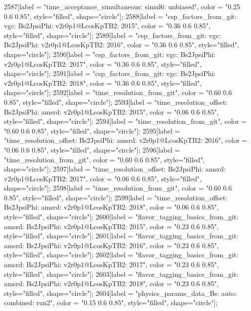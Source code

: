{	2587[label = "time_acceptance_simultaneous\ntimeacc: simul6\ntrigger: unbiased", color = "0.25 0.6 0.85", style="filled", shape="circle"];
	2588[label = "csp_factors_from_git\ncsp: vgc\nmode: Bs2JpsiPhi\nversion: v2r0p1@LcosKpTB2\nyear: 2015", color = "0.36 0.6 0.85", style="filled", shape="circle"];
	2589[label = "csp_factors_from_git\ncsp: vgc\nmode: Bs2JpsiPhi\nversion: v2r0p1@LcosKpTB2\nyear: 2016", color = "0.36 0.6 0.85", style="filled", shape="circle"];
	2590[label = "csp_factors_from_git\ncsp: vgc\nmode: Bs2JpsiPhi\nversion: v2r0p1@LcosKpTB2\nyear: 2017", color = "0.36 0.6 0.85", style="filled", shape="circle"];
	2591[label = "csp_factors_from_git\ncsp: vgc\nmode: Bs2JpsiPhi\nversion: v2r0p1@LcosKpTB2\nyear: 2018", color = "0.36 0.6 0.85", style="filled", shape="circle"];
	2592[label = "time_resolution_from_git", color = "0.60 0.6 0.85", style="filled", shape="circle"];
	2593[label = "time_resolution_offset\nmode: Bs2JpsiPhi\ntimeres: amsrd\nversion: v2r0p1@LcosKpTB2\nyear: 2015", color = "0.06 0.6 0.85", style="filled", shape="circle"];
	2594[label = "time_resolution_from_git", color = "0.60 0.6 0.85", style="filled", shape="circle"];
	2595[label = "time_resolution_offset\nmode: Bs2JpsiPhi\ntimeres: amsrd\nversion: v2r0p1@LcosKpTB2\nyear: 2016", color = "0.06 0.6 0.85", style="filled", shape="circle"];
	2596[label = "time_resolution_from_git", color = "0.60 0.6 0.85", style="filled", shape="circle"];
	2597[label = "time_resolution_offset\nmode: Bs2JpsiPhi\ntimeres: amsrd\nversion: v2r0p1@LcosKpTB2\nyear: 2017", color = "0.06 0.6 0.85", style="filled", shape="circle"];
	2598[label = "time_resolution_from_git", color = "0.60 0.6 0.85", style="filled", shape="circle"];
	2599[label = "time_resolution_offset\nmode: Bs2JpsiPhi\ntimeres: amsrd\nversion: v2r0p1@LcosKpTB2\nyear: 2018", color = "0.06 0.6 0.85", style="filled", shape="circle"];
	2600[label = "flavor_tagging_basics_from_git\nflavor: amsrd\nmode: Bs2JpsiPhi\nversion: v2r0p1@LcosKpTB2\nyear: 2015", color = "0.23 0.6 0.85", style="filled", shape="circle"];
	2601[label = "flavor_tagging_basics_from_git\nflavor: amsrd\nmode: Bs2JpsiPhi\nversion: v2r0p1@LcosKpTB2\nyear: 2016", color = "0.23 0.6 0.85", style="filled", shape="circle"];
	2602[label = "flavor_tagging_basics_from_git\nflavor: amsrd\nmode: Bs2JpsiPhi\nversion: v2r0p1@LcosKpTB2\nyear: 2017", color = "0.23 0.6 0.85", style="filled", shape="circle"];
	2603[label = "flavor_tagging_basics_from_git\nflavor: amsrd\nmode: Bs2JpsiPhi\nversion: v2r0p1@LcosKpTB2\nyear: 2018", color = "0.23 0.6 0.85", style="filled", shape="circle"];
	2604[label = "physics_params_data_Bs\nfit: auto\ntrigger: combined\nyear: run2", color = "0.15 0.6 0.85", style="filled", shape="circle"];
}
